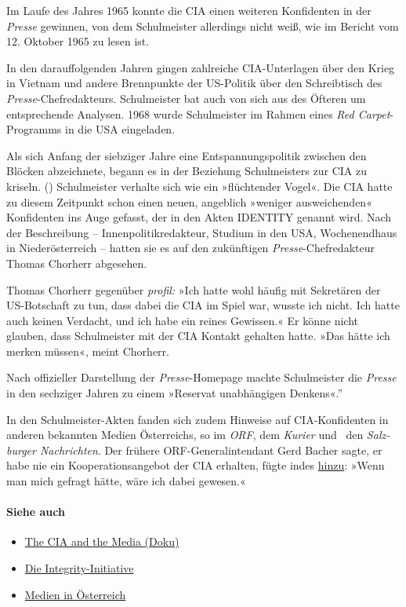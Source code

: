 Im Laufe des Jahres 1965 konnte die CIA einen weiteren Konfidenten in
der \emph{Presse} gewinnen, von dem Schulmeister allerdings nicht weiß,
wie im Bericht vom 12. Oktober 1965 zu lesen ist.

In den darauf­folgenden Jahren gingen zahlreiche CIA-Unterlagen über den
Krieg in Vietnam und andere Brennpunkte der US-Politik über den
Schreibtisch des \emph{Presse}-Chefredakteurs. Schulmeister bat auch von
sich aus des Öfteren um entsprechende Analysen. 1968 wurde Schulmeister
im Rahmen eines \emph{Red Carpet}-Programms in die USA eingeladen.

Als sich Anfang der siebziger Jahre eine Entspannungs­politik zwischen
den Blöcken abzeichnete, begann es in der Beziehung Schulmeisters zur
CIA zu kriseln. () Schulmeister verhalte sich wie ein »flüchtender
Vogel«. Die CIA hatte zu diesem Zeitpunkt schon einen neuen, angeblich
»weniger ausweichenden« Konfidenten ins Auge gefasst, der in den Akten
IDENTITY genannt wird. Nach der Beschreibung -- Innen­politik­redakteur,
Studium in den USA, Wochenend­haus in Nieder­österreich -- hatten sie es
auf den zukünftigen \emph{Presse}-Chefredakteur Thomas Chorherr
abgesehen.

Thomas Chorherr gegenüber \emph{profil:} »Ich hatte wohl häufig mit
Sekretären der US-Botschaft zu tun, dass dabei die CIA im Spiel war,
wusste ich nicht. Ich hatte auch keinen Verdacht, und ich habe ein
reines Gewissen.« Er könne nicht glauben, dass Schulmeister mit der CIA
Kontakt gehalten hatte. »Das hätte ich merken müssen«, meint Chorherr.

Nach offizieller Darstellung der \emph{Presse}-Homepage machte
Schulmeister die \emph{Presse} in den sechziger Jahren zu einem
»Reservat unabhängigen Denkens«.''

In den Schulmeister-Akten fanden sich zudem Hinweise auf CIA-Konfidenten
in anderen bekannten Medien Österreichs, so im \emph{ORF}, dem
\emph{Kurier} und~ den \emph{Salz­burger Nach­richten}. Der frühere
ORF-General­intendant Gerd Bacher sagte, er habe nie ein
Kooperationsangebot der CIA erhalten, fügte indes
\href{https://www.diepresse.com/471594/otto-schulmeister-in-den-akten-der-cia}{hinzu}:
»Wenn man mich gefragt hätte, wäre ich dabei gewesen.«

\hypertarget{siehe-auch}{%
\paragraph{Siehe auch}\label{siehe-auch}}

\begin{itemize}
\tightlist
\item
  \href{https://swprs.org/video-the-cia-and-the-media/}{The CIA and the
  Media (Doku)}
\item
  \href{https://swprs.org/die-integrity-initiative/}{Die
  Integrity-Initiative}
\item
  \href{https://swprs.org/medien-in-oesterreich/}{Medien in Österreich}
\end{itemize}

